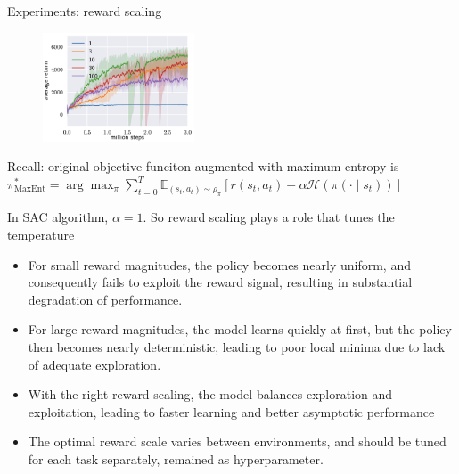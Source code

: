 \documentclass[8pt]{beamer}
\begin{document}
\begin{frame}{Experiments: reward scaling}
    \begin{figure}
        \centering
        \includegraphics[width=0.4\textwidth]{fig3.png}
    \end{figure}

    Recall: original objective funciton augmented with maximum entropy is 
    \(
        \pi_{\text{MaxEnt}}^\ast = \arg \max_{\pi} \sum_{t=0}^T \mathbb{E}_{(s_t, a_t) \sim \rho_\pi}[r(s_t, a_t) + \alpha \mathcal{H}(\pi(\cdot \mid s_t))]
    \)

    In SAC algorithm, $\alpha=1$. So reward scaling plays a role that tunes the temperature

    \begin{itemize}
        \item For small reward magnitudes, the policy becomes nearly uniform, and consequently fails to exploit the reward signal, resulting in substantial degradation of performance. 
        \item For large reward magnitudes, the model learns quickly at first, but the policy then becomes nearly deterministic, leading to poor local minima due to lack of adequate exploration.
        \item With the right reward scaling, the model balances exploration and exploitation, leading to faster learning and better asymptotic performance
        \item The optimal reward scale varies between environments, and should be tuned for each task separately, remained as hyperparameter.
    \end{itemize}
\end{frame}
\end{document}
